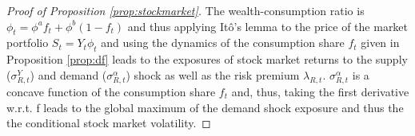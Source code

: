 \documentclass[preprint,11pt,authoryear]{elsarticle}
\theoremstyle{plain}
\begin{document}
\begin{proof}[Proof of Proposition \ref{prop:stockmarket}]
 The wealth-consumption ratio is $\phi_t = \phi^{a} f_t + \phi^{b} (1-f_t)$ and thus applying It\^o's lemma to the price of the market portfolio $S_t = Y_t \phi_t$ and using the dynamics of the consumption share $f_t$ given in Proposition \ref{prop:df} leads to the exposures of stock market returns to the supply ($\sigma_{R,t}^Y$) and demand ($\sigma_{R,t}^{\alpha}$) shock as well as the risk premium $\lambda_{R,t}$. $\sigma_{R,t}^{\alpha}$ is a concave function of the consumption share $f_t$ and, thus, taking the first derivative w.r.t. f leads to the global maximum of the demand shock exposure and thus the the conditional stock market volatility.   
\end{proof}

 
 
\end{document}

